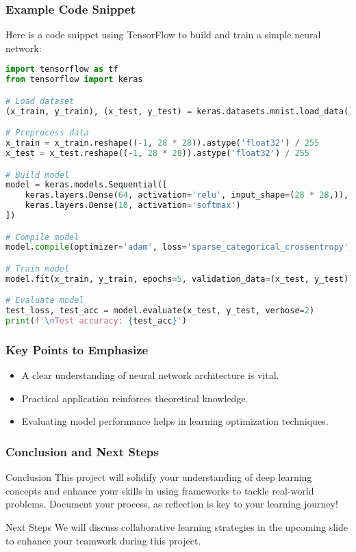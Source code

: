 \documentclass[aspectratio=169]{beamer}
\begin{document}
\begin{frame}[fragile]
    \frametitle{Example Code Snippet}
    Here is a code snippet using TensorFlow to build and train a simple neural network:
    
    \begin{lstlisting}[language=Python]
import tensorflow as tf
from tensorflow import keras

# Load dataset
(x_train, y_train), (x_test, y_test) = keras.datasets.mnist.load_data()

# Preprocess data
x_train = x_train.reshape((-1, 28 * 28)).astype('float32') / 255
x_test = x_test.reshape((-1, 28 * 28)).astype('float32') / 255

# Build model
model = keras.models.Sequential([
    keras.layers.Dense(64, activation='relu', input_shape=(28 * 28,)),
    keras.layers.Dense(10, activation='softmax')
])

# Compile model
model.compile(optimizer='adam', loss='sparse_categorical_crossentropy', metrics=['accuracy'])

# Train model
model.fit(x_train, y_train, epochs=5, validation_data=(x_test, y_test))

# Evaluate model
test_loss, test_acc = model.evaluate(x_test, y_test, verbose=2)
print(f'\nTest accuracy: {test_acc}')
    \end{lstlisting}

\end{frame}

\begin{frame}[fragile]
    \frametitle{Key Points to Emphasize}
    \begin{itemize}
        \item A clear understanding of neural network architecture is vital.
        \item Practical application reinforces theoretical knowledge.
        \item Evaluating model performance helps in learning optimization techniques.
    \end{itemize}
\end{frame}

\begin{frame}[fragile]
    \frametitle{Conclusion and Next Steps}
    \begin{block}{Conclusion}
        This project will solidify your understanding of deep learning concepts and enhance your skills in using frameworks to tackle real-world problems. Document your process, as reflection is key to your learning journey!
    \end{block}
    
    \begin{block}{Next Steps}
        We will discuss collaborative learning strategies in the upcoming slide to enhance your teamwork during this project.
    \end{block}
\end{frame}
\end{document}
